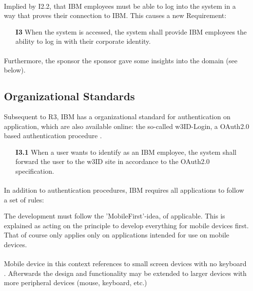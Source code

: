 \paragraph{} Implied by I2.2, that IBM employees must be able to log into the system in a way that proves their connection to IBM. This causes a new Requirement:

\begin{itemize}
    \item [\textbf{I3}] When the system is accessed, the system shall provide IBM employees the ability to log in with their corporate identity.
\end{itemize}


\paragraph{} Furthermore, the sponsor the sponsor gave some insights into the domain (see below).

\subsection{Organizational Standards}
Subsequent to R3, IBM has a organizational standard for authentication on application, which are also available online: the so-called w3ID-Login, a OAuth2.0 \parencite[cf.][]{InternetEngineeringTaskForce.2012} based authentication procedure \parencite[cf.][]{IBMCorporation.2016}.

\begin{itemize}
    \item [\textbf{I3.1}] When a user wants to identify as an IBM employee, the system shall forward the user to the w3ID site in accordance to the OAuth2.0 specification.
\end{itemize}

\paragraph{} In addition to authentication procedures, IBM requires all applications to follow a set of rules:

\paragrapph{} The development must follow the 'MobileFirst'-idea, of applicable. This is explained as acting on the principle to develop everything for mobile devices first. That of course only applies only on applications intended for use on mobile devices.

\paragraph{} Mobile device in this context references to small screen devices with no keyboard \parencite[cf.][]{Duong.2014}. Afterwards the design and functionality may be extended to larger devices with more peripheral devices (mouse, keyboard, etc.)

